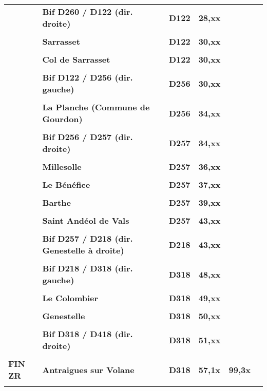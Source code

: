 \documentclass{article}%
\begin{document}
\begin{longtable}{p{2.25cm}|p{7.0cm}|p{1.5cm}|p{1.5cm}|p{1.5cm}|p{3.5cm}}
 &\textbf{Bif D260 / D122 (dir. droite)}&\textbf{D122}&\textbf{28,xx}& & \\%
 & & & & & \\%
 &\textbf{Sarrasset}&\textbf{D122}&\textbf{30,xx}& & \\%
 & & & & & \\%
 &\textbf{Col de Sarrasset}&\textbf{D122}&\textbf{30,xx}& & \\%
 & & & & & \\%
 &\textbf{Bif D122 / D256 (dir. gauche)}&\textbf{D256}&\textbf{30,xx}& & \\%
 & & & & & \\%
 &\textbf{La Planche (Commune de Gourdon)}&\textbf{D256}&\textbf{34,xx}& & \\%
 & & & & & \\%
 &\textbf{Bif D256 / D257 (dir. droite)}&\textbf{D257}&\textbf{34,xx}& & \\%
 & & & & & \\%
 &\textbf{Millesolle}&\textbf{D257}&\textbf{36,xx}& & \\%
 & & & & & \\%
 &\textbf{Le Bénéfice}&\textbf{D257}&\textbf{37,xx}& & \\%
 & & & & & \\%
 &\textbf{Barthe}&\textbf{D257}&\textbf{39,xx}& & \\%
 & & & & & \\%
 &\textbf{Saint Andéol de Vals}&\textbf{D257}&\textbf{43,xx}& & \\%
 & & & & & \\%
 &\textbf{Bif D257 / D218 (dir. Genestelle à droite)}&\textbf{D218}&\textbf{43,xx}& & \\%
 & & & & & \\%
 &\textbf{Bif D218 / D318 (dir. gauche)}&\textbf{D318}&\textbf{48,xx}& & \\%
 & & & & & \\%
 &\textbf{Le Colombier}&\textbf{D318}&\textbf{49,xx}& & \\%
 & & & & & \\%
 &\textbf{Genestelle }&\textbf{D318}&\textbf{50,xx}& & \\%
 & & & & & \\%
 &\textbf{Bif D318 / D418 (dir. droite)}&\textbf{D318 }&\textbf{51,xx}& & \\%
 & & & & & \\%
\textbf{FIN ZR}&\textbf{Antraigues sur Volane }&\textbf{D318}&\textbf{57,1x}&\textbf{99,3x}& \\%
 & & & & & \\%

\end{longtable}
\end{document}
